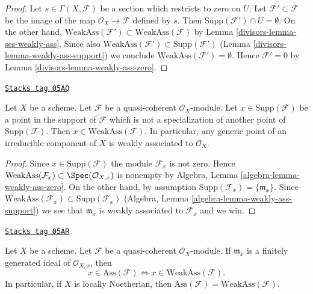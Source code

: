 \begin{proof}

Let $s \in \Gamma(X, \mathcal{F})$ be a section which restricts to zero on $U$.
Let $\mathcal{F}' \subset \mathcal{F}$ be the image of the map
$\mathcal{O}_X \to \mathcal{F}$ defined by $s$. Then
$\text{Supp}(\mathcal{F}') \cap U = \emptyset$. On the other hand,
$\text{WeakAss}(\mathcal{F}') \subset \text{WeakAss}(\mathcal{F})$
by Lemma \ref{divisors-lemma-ses-weakly-ass}. Since also
$\text{WeakAss}(\mathcal{F}') \subset \text{Supp}(\mathcal{F}')$
(Lemma \ref{divisors-lemma-weakly-ass-support}) we conclude
$\text{WeakAss}(\mathcal{F}') = \emptyset$.
Hence $\mathcal{F}' = 0$ by Lemma \ref{divisors-lemma-weakly-ass-zero}.
\end{proof}

\begin{lemma}
\label{divisors-lemma-minimal-support-in-weakly-ass}
\href{https://stacks.math.columbia.edu/tag/05AQ}{\texttt{Stacks tag 05AQ}}

Let $X$ be a scheme.
Let $\mathcal{F}$ be a quasi-coherent $\mathcal{O}_X$-module.
Let $x \in \text{Supp}(\mathcal{F})$ be a point in the support
of $\mathcal{F}$ which is not a specialization of another point of
$\text{Supp}(\mathcal{F})$. Then
$x \in \text{WeakAss}(\mathcal{F})$.
In particular, any generic point of an irreducible component of $X$
is weakly associated to $\mathcal{O}_X$.
\end{lemma}

\begin{proof}
Since $x \in \text{Supp}(\mathcal{F})$ the module $\mathcal{F}_x$
is not zero. Hence
$\text{WeakAss}(\mathcal{F}_x) \subset \Spec(\mathcal{O}_{X, x})$
is nonempty by
Algebra, Lemma \ref{algebra-lemma-weakly-ass-zero}.
On the other hand, by assumption
$\text{Supp}(\mathcal{F}_x) = \{\mathfrak m_x\}$.
Since
$\text{WeakAss}(\mathcal{F}_x) \subset \text{Supp}(\mathcal{F}_x)$
(Algebra, Lemma \ref{algebra-lemma-weakly-ass-support})
we see that $\mathfrak m_x$ is weakly associated to $\mathcal{F}_x$
and we win.
\end{proof}

\begin{lemma}
\label{divisors-lemma-ass-weakly-ass}
\href{https://stacks.math.columbia.edu/tag/05AR}{\texttt{Stacks tag 05AR}}

Let $X$ be a scheme.
Let $\mathcal{F}$ be a quasi-coherent $\mathcal{O}_X$-module.
If $\mathfrak m_x$ is a finitely generated ideal of $\mathcal{O}_{X, x}$,
then
$$
x \in \text{Ass}(\mathcal{F}) \Leftrightarrow
x \in \text{WeakAss}(\mathcal{F}).
$$
In particular, if $X$ is locally Noetherian, then
$\text{Ass}(\mathcal{F}) = \text{WeakAss}(\mathcal{F})$.
\end{lemma}

